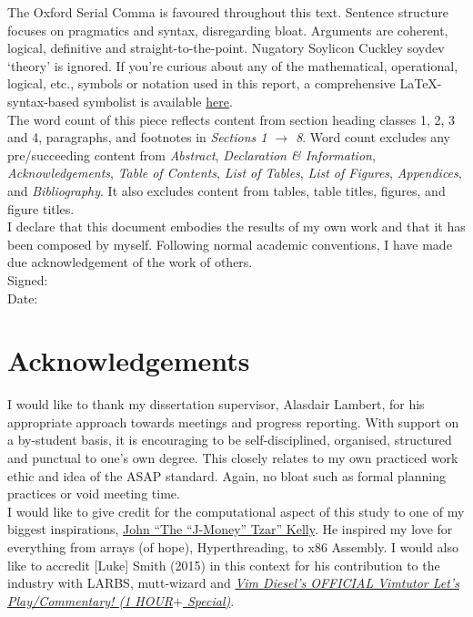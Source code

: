 \documentclass[11pt, english]{article}
\begin{document}
	The Oxford Serial Comma is favoured throughout this text. Sentence structure focuses on pragmatics and syntax, disregarding bloat. Arguments are coherent, logical, definitive and straight-to-the-point. Nugatory Soylicon Cuckley soydev `theory' is ignored. If you're curious about any of the mathematical, operational, logical, etc., symbols or notation used in this report, a comprehensive {\LaTeX}-syntax-based symbolist is available \href{http://lewisbritton.com/Library.html/Writings/Symbol-List.pdf}{here}.\\
 
	The word count of this piece reflects content from section heading classes 1, 2, 3 and 4, paragraphs, and footnotes in \textit{Sections 1 $\rightarrow$ 8}. Word count excludes any pre/succeeding content from \textit{Abstract}, \textit{Declaration \& Information}, \textit{Acknowledgements}, \textit{Table of Contents}, \textit{List of Tables}, \textit{List of Figures}, \textit{Appendices}, and \textit{Bibliography}. It also excludes content from tables, table titles, figures, and figure titles.\\

	I declare that this document embodies the results of my own work and that it has been composed by myself. Following normal academic conventions, I have made due acknowledgement of the work of others.\\

	Signed:\\ 

	Date:

\newpage

	\section*{Acknowledgements}

I would like to thank my dissertation supervisor, Alasdair Lambert, for his appropriate approach towards meetings and progress reporting. With support on a by-student basis, it is encouraging to be self-disciplined, organised, structured and punctual to one's own degree. This closely relates to my own practiced work ethic and idea of the ASAP standard. Again, no bloat such as formal planning practices or void meeting time.\\

I would like to give credit for the computational aspect of this study to one of my biggest inspirations, \href{http://lewisbritton.com/Blog/Founding-Fathers.html}{John ``The ``J-Money'' Tzar'' Kelly}. He inspired my love for everything from arrays (of hope), Hyperthreading, to x86 Assembly. I would also like to accredit [Luke] Smith (2015) in this context for his contribution to the industry with LARBS, mutt-wizard and \href{https://m.youtube.com/watch?v=d8XtNXutVto}{\textit{Vim Diesel's OFFICIAL Vimtutor Let's Play/Commentary! (1 HOUR$+$ Special)}}.\\
\end{document}
